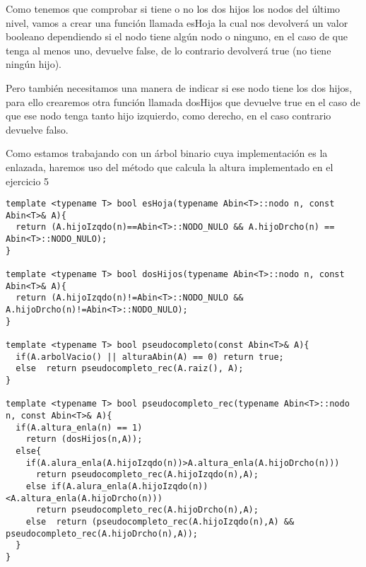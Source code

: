 Como tenemos que comprobar si tiene o no los dos hijos los nodos del último nivel, vamos a crear una función llamada esHoja la cual nos devolverá un valor booleano dependiendo si el nodo tiene algún nodo o ninguno, en el caso de que tenga al menos uno, devuelve false, de lo contrario devolverá true (no tiene ningún hijo).

Pero también necesitamos una manera de indicar si ese nodo tiene los dos hijos, para ello crearemos otra función llamada dosHijos que devuelve true en el caso de que ese nodo tenga tanto hijo izquierdo, como derecho, en el caso contrario devuelve falso.

Como estamos trabajando con un árbol binario cuya implementación es la enlazada, haremos uso del método que calcula la altura implementado en el ejercicio 5

\begin{verbatim}
template <typename T> bool esHoja(typename Abin<T>::nodo n, const Abin<T>& A){
  return (A.hijoIzqdo(n)==Abin<T>::NODO_NULO && A.hijoDrcho(n) == Abin<T>::NODO_NULO);
}

template <typename T> bool dosHijos(typename Abin<T>::nodo n, const Abin<T>& A){
  return (A.hijoIzqdo(n)!=Abin<T>::NODO_NULO && A.hijoDrcho(n)!=Abin<T>::NODO_NULO);
}

template <typename T> bool pseudocompleto(const Abin<T>& A){
  if(A.arbolVacio() || alturaAbin(A) == 0) return true;
  else  return pseudocompleto_rec(A.raiz(), A);
}

template <typename T> bool pseudocompleto_rec(typename Abin<T>::nodo n, const Abin<T>& A){
  if(A.altura_enla(n) == 1)
    return (dosHijos(n,A));
  else{
    if(A.alura_enla(A.hijoIzqdo(n))>A.altura_enla(A.hijoDrcho(n)))
      return pseudocompleto_rec(A.hijoIzqdo(n),A);
    else if(A.alura_enla(A.hijoIzqdo(n))<A.altura_enla(A.hijoDrcho(n)))
      return pseudocompleto_rec(A.hijoDrcho(n),A);
    else  return (pseudocompleto_rec(A.hijoIzqdo(n),A) && pseudocompleto_rec(A.hijoDrcho(n),A));
  }
}
\end{verbatim}

